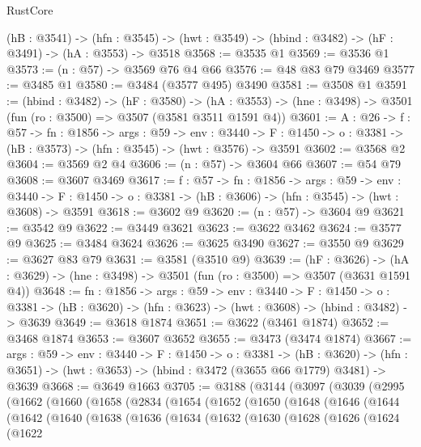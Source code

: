 \begin{lexlean}{RustCore}
\begin{coremodule}
  (hB : @3541) ->
  (hfn : @3545) -> (hwt : @3549) -> (hbind : @3482) -> (hF : @3491) -> (hA : @3553) -> @3518
@3568 := @3535 @1
@3569 := @3536 @1
@3573 := (n : @57) -> @3569 @76 @4 @66
@3576 := @48 @83 @79 @3469
@3577 := @3485 @1
@3580 := @3484 (@3577 @495) @3490
@3581 := @3508 @1
@3591 := (hbind : @3482) ->
  (hF : @3580) ->
  (hA : @3553) -> (hne : @3498) -> @3501 (fun (ro : @3500) => @3507 (@3581 @3511 @1591 @4))
@3601 := {A : @26} ->
  {f : @57} ->
  {fn : @1856} ->
  {args : @59} ->
  {env : @3440} ->
  {F : @1450} -> {o : @3381} -> (hB : @3573) -> (hfn : @3545) -> (hwt : @3576) -> @3591
@3602 := @3568 @2
@3604 := @3569 @2 @4
@3606 := (n : @57) -> @3604 @66
@3607 := @54 @79
@3608 := @3607 @3469
@3617 := {f : @57} ->
  {fn : @1856} ->
  {args : @59} ->
  {env : @3440} ->
  {F : @1450} -> {o : @3381} -> (hB : @3606) -> (hfn : @3545) -> (hwt : @3608) -> @3591
@3618 := @3602 @9
@3620 := (n : @57) -> @3604 @9
@3621 := @3542 @9
@3622 := @3449 @3621
@3623 := @3622 @3462
@3624 := @3577 @9
@3625 := @3484 @3624
@3626 := @3625 @3490
@3627 := @3550 @9
@3629 := @3627 @83 @79
@3631 := @3581 (@3510 @9)
@3639 := (hF : @3626) ->
  (hA : @3629) -> (hne : @3498) -> @3501 (fun (ro : @3500) => @3507 (@3631 @1591 @4))
@3648 := {fn : @1856} ->
  {args : @59} ->
  {env : @3440} ->
  {F : @1450} ->
  {o : @3381} -> (hB : @3620) -> (hfn : @3623) -> (hwt : @3608) -> (hbind : @3482) -> @3639
@3649 := @3618 @1874
@3651 := @3622 (@3461 @1874)
@3652 := @3468 @1874
@3653 := @3607 @3652
@3655 := @3473 (@3474 @1874)
@3667 := {args : @59} ->
  {env : @3440} ->
  {F : @1450} ->
  {o : @3381} ->
  (hB : @3620) -> (hfn : @3651) -> (hwt : @3653) -> (hbind : @3472 (@3655 @66 @1779) @3481) -> @3639
@3668 := @3649 @1663
@3705 := @3188
    (@3144
      (@3097
        (@3039
          (@2995
            (@1662
              (@1660
                (@1658
                  (@2834
                    (@1654
                      (@1652
                        (@1650
                          (@1648
                            (@1646
                              (@1644
                                (@1642
                                  (@1640
                                    (@1638
                                      (@1636
                                        (@1634
                                          (@1632
                                            (@1630
                                              (@1628
                                                (@1626
                                                  (@1624
                                                    (@1622

\end{coremodule}
\end{lexlean}
